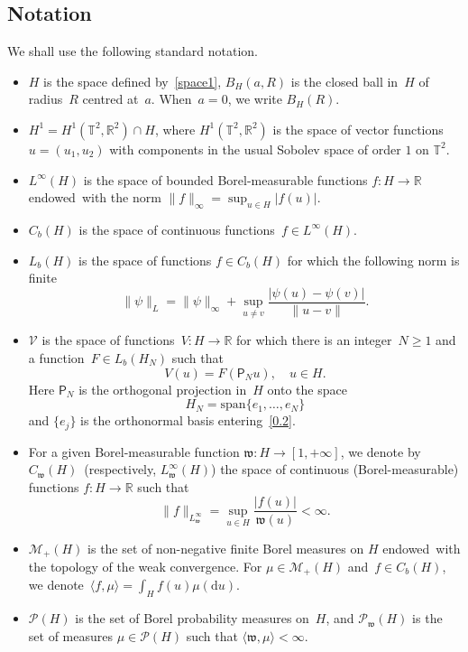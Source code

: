 \documentclass[10pt]{amsart}
\theoremstyle{definition}\newtheorem{defi}[theo]{Definition}\newtheorem{rema}[theo]{Remark}\newtheorem{exam}[theo]{Example}\newtheorem{exem}[theo]{Example}\newtheorem{nota}[theo]{Notation}
\newcommand{\R}{{\mathbb R}}
\newcommand{\T}{{\mathbb T}}
\newcommand{\MM}{{\mathcal M}}
\newcommand{\PP}{{\mathcal P}}
\newcommand{\VV}{{\mathcal V}}
\newcommand{\ty}{\infty}
\newcommand{\wwww}{{\mathfrak w}}
\newcommand{\pp}{{{\mathsf P}_N}}
\newcommand{\lag}{\langle}
\newcommand{\rag}{\rangle}
\newcommand{\dd}{\mathrm{d}}
\begin{document}
\subsection*{Notation}

We shall use the following standard notation.
\begin{itemize}
\item
$H$ is the space defined by~\eqref{space1}, $B_H(a,R)$ is the closed ball in~$H$ of radius~$R$ centred at~$a$. When~$a=0$, we write $B_H(R)$.

\item
$H^1= H^1(\T^2, \R^2)\cap H$, where $H^1(\T^2, \R^2)$ is the space of vector functions $u = (u_1,u_2)$ with components in the usual Sobolev space of order $1$ on $\T^2$.

\item
$L^\infty(H)$ is the space of bounded Borel-measurable functions $f:H\to\R$ endowed~with the norm $\|f\|_\infty=\sup_{u\in H}|f(u)|$.

\item
$C_b(H)$ is the space of continuous functions~$f\in L^\infty(H)$.

\item
$L_b(H)$ is the space of functions $f\in C_b(H)$ for which the following norm is finite
\[
\|\psi\|_{L}=\|\psi\|_\infty+\sup_{u\neq v} \frac{ {|\psi(u)-\psi(v)|}}{ \|u-v\| }.
\]

\item
$\VV$ is the space of functions~$V:H\to \R$ for which there is an integer~$N \ge 1$ and a function~$F \in L_b(H_N)$ such that
\begin{equation}\label{repres}
V(u)=F(\pp u),\quad u\in H.
\end{equation}
Here $\pp$ is the orthogonal projection in~$H$ onto the space
\begin{equation}\label{ddftgr}
H_N=\text{span}\{e_1,\ldots, e_N\}
\end{equation}
and $\{e_j\}$ is the orthonormal basis entering~\eqref{0.2}.

\item
For a given Borel-measurable function ${\wwww}:H\to[1,+\infty]$, we denote by $C_\wwww(H)$~(respectively, $L_\wwww^\infty(H)$) the space of continuous (Borel-measurable) functions $f:H\to\R$ such that
\[
\|f\|_{L_\wwww^\infty}=\sup_{u\in H}\frac{|f(u)|}{\wwww(u)}<\ty.
\]

\item
$\MM_+(H)$ is the set of non-negative finite Borel measures on $H$ endowed~with the topology of the weak convergence. For $\mu\in \MM_+(H)$ and~$f\in C_b(H)$, we denote~$\lag f,\mu\rag=\int_Hf(u)\mu(\dd u).$

\item
$\PP(H)$ is the set of Borel probability measures on~$H$, and $\PP_\wwww(H)$ is the set of measures $\mu\in\PP(H)$ such that $\langle \wwww,\mu\rangle<\infty$.
\end{itemize}
\end{document}
